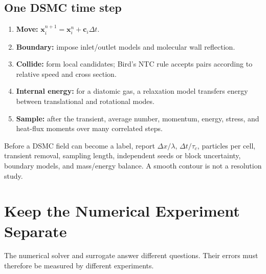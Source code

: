 \documentclass[11pt]{article}
\begin{document}
\subsection{One DSMC time step}
\begin{center}
\end{center}

\begin{enumerate}
\item \textbf{Move:} $\bm x_i^{n+1}=\bm x_i^n+\bm c_i\Delta t$.
\item \textbf{Boundary:} impose inlet/outlet models and molecular wall reflection.
\item \textbf{Collide:} form local candidates; Bird's NTC rule accepts pairs
according to relative speed and cross section.
\item \textbf{Internal energy:} for a diatomic gas, a relaxation model transfers
energy between translational and rotational modes.
\item \textbf{Sample:} after the transient, average number, momentum, energy,
stress, and heat-flux moments over many correlated steps.
\end{enumerate}

\begin{evidencebox}
Before a DSMC field can become a label, report $\Delta x/\lambda$,
$\Delta t/\tau_c$, particles per cell, transient removal, sampling length,
independent seeds or block uncertainty, boundary models, and mass/energy balance.
A smooth contour is not a resolution study.
\end{evidencebox}

\clearpage
\section{Keep the Numerical Experiment Separate}
The numerical solver and surrogate answer different questions. Their errors
must therefore be measured by different experiments.
\end{document}
